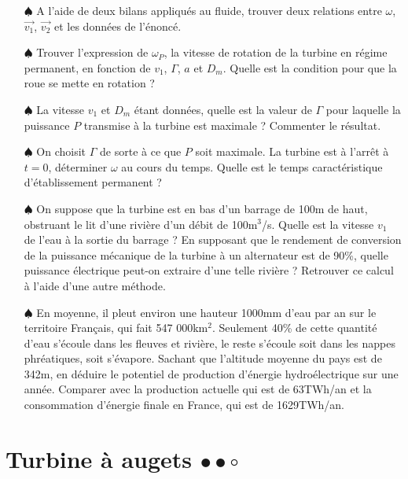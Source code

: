 \documentclass{report}
\begin{document}
\begin{itemize}

	\item[$\spadesuit$] A l'aide de deux bilans appliqués au fluide, trouver deux relations entre $\omega$,  $\vec{v_1}$,  $\vec{v_2}$ et les données de l'énoncé.
	
	\item[$\spadesuit$] Trouver l'expression de $\omega_P$, la vitesse de rotation de la turbine en régime permanent, en fonction de $v_1$, $\Gamma$, $a$ et $D_m$. Quelle est la condition pour que la roue se mette en rotation ?
	
	\item[$\spadesuit$] La vitesse $v_1$ et $D_m$ étant données, quelle est la valeur de $\Gamma$ pour laquelle la puissance $P$ transmise à la turbine est maximale ? Commenter le résultat.
	
	\item[$\spadesuit$] On choisit $\Gamma$ de sorte à ce que $P$ soit maximale. La turbine est à l'arrêt à $t=0$, déterminer $\omega$ au cours du temps. Quelle est le temps caractéristique d'établissement permanent ?
	
	\item[$\spadesuit$] On suppose que la turbine est en bas d'un barrage de 100m de haut, obstruant le lit d'une rivière d'un débit de 100m$^3$/s. Quelle est la vitesse $v_1$ de l'eau à la sortie du barrage ? En supposant que le rendement de conversion de la puissance mécanique de la turbine à un alternateur est de 90\%, quelle puissance électrique peut-on extraire d'une telle rivière ? Retrouver ce calcul à l'aide d'une autre méthode.
	
	\item[$\spadesuit$] En moyenne, il pleut environ une hauteur 1000mm d'eau par an sur le territoire Français, qui fait 547 000km$^2$. Seulement 40\% de cette quantité d'eau s'écoule dans les fleuves et rivière, le reste s'écoule soit dans les nappes phréatiques, soit s'évapore. Sachant que l'altitude moyenne du pays est de 342m, en déduire le potentiel de production d'énergie hydroélectrique sur une année. Comparer avec la production actuelle qui est de 63TWh/an et la consommation d'énergie finale en France, qui est de 1629TWh/an.

\end{itemize}

\newpage

\section*{Turbine à augets $\bullet\bullet\circ$}
\end{document}
